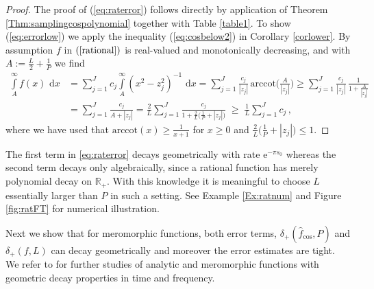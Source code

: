 \documentclass[11pt,a4paper]{scrartcl}
\renewcommand{\d}{\,\mathrm{d}}
\numberwithin{equation}{section}
\numberwithin{table}{section}
\numberwithin{figure}{section}
\newcommand{\e}{\mathrm e}
\newcommand{\arccot}{\mathrm{arccot}}
\newcommand{\Rp}{{\mathbb R}_{+}}
\newcommand{\fcos}{{\hat f}_{\cos}}
\begin{document}
\begin{proof} The proof of (\ref{eq:raterror}) follows directly by application of Theorem \ref{Thm:samplingcospolynomial} together with Table \ref{table1}. To show (\ref{eq:errorlow}) we apply the inequality (\ref{eq:cosbelow2}) in Corollary \ref{corlower}.  By assumption $f$ in $(\ref{rational})$  is real-valued and monotonically decreasing, and with $A := \frac{L}{2}+\frac{1}{P}$ we find
\begin{align*} \textstyle \int\limits_{A}^{\infty} f(x) \, \d x
&=   \textstyle \sum\limits_{j=1}^J c_{j}  \int\limits_{A}^{\infty} (x^2-z_j^2)^{-1} \, \d x
=  \sum\limits_{j=1}^J \frac{c_{j}}{|z_j|} \, \arccot\big(\tfrac{A}{|z_j|} \big)
\ge  \sum\limits_{j=1}^J \frac{c_{j}}{|z_j|} \, \frac{1}{ 1+\frac{A}{|z_j|}} \\
&= \textstyle \sum\limits_{j=1}^J \frac{c_j}{A + |z_j|}
= \frac{2}{L}\sum\limits_{j=1}^J \frac{c_j}{1 + \frac{2}{L}\big(\frac1P+|z_j|\big)}
\;\ge\; \frac{1}{L} \sum\limits_{j=1}^J c_j\,,
\end{align*}
where we have used that $\arccot(x) \ge \frac{1}{x+1}$ for $x \ge 0$ and
$\frac{2}{L}\big(\frac1P+|z_j|\big) \le 1$.
\end{proof}

\medskip

The first term in  \eqref{eq:raterror} decays geometrically with rate
$\e^{-\pi s_0}$
whereas the second term  decays only algebraically, since a rational function has
merely polynomial decay on $\Rp$. With this knowledge it is meaningful to choose $L$ essentially larger than $P$ in such a setting. See Example \ref{Ex:ratnum} and Figure \ref{fig:ratFT} for numerical illustration.
\medskip

Next we show that for  meromorphic functions, both error terms, $\delta_+(\fcos,P)$ and $\delta_+(f,L)$ can decay geometrically and moreover the error estimates are tight.
 We refer to  \cite{St76,St81,St93} for further studies of analytic and meromorphic
functions with geometric decay properties in time and frequency.
\end{document}
